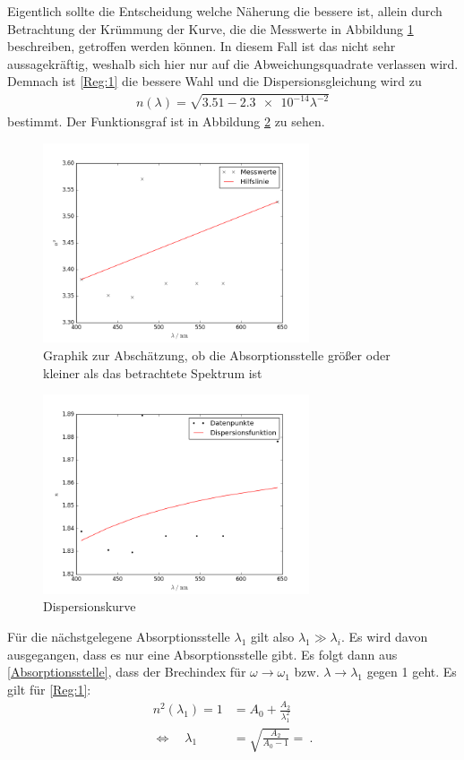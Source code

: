 Eigentlich sollte die Entscheidung welche Näherung die bessere ist, allein durch Betrachtung der Krümmung der Kurve, die die Messwerte in Abbildung \ref{Abb:Krummung} beschreiben, getroffen werden können. In diesem Fall ist das nicht sehr aussagekräftig, weshalb sich hier nur auf die Abweichungsquadrate verlassen wird. Demnach ist \eqref{Reg:1} die bessere Wahl und die Dispersionsgleichung wird zu
\begin{align*}
	n(\lambda) = \sqrt{3.51 - \SI{2.3e-14}\lambda^{-2}}
\end{align*}
bestimmt. Der Funktionsgraf ist in Abbildung \ref*{fig:DispKurve} zu sehen.
\begin{figure}[h!]
	\centering
	\includegraphics[width=0.7\textwidth]{Tendenz.png}
	\caption{Graphik zur Abschätzung, ob die Absorptionsstelle größer oder kleiner als das betrachtete Spektrum ist}
	\label{Abb:Krummung}
\end{figure}
\begin{figure}[h!]
	\centering
	\includegraphics[width=0.7\textwidth]{Dispersionskurve.png}
	\caption{Dispersionskurve}
	\label{fig:DispKurve}
\end{figure}
\newline
Für die nächstgelegene Absorptionsstelle $\lambda_1$ gilt also $\lambda_1\gg\lambda_i$. Es wird davon ausgegangen, dass es nur eine Absorptionsstelle gibt. Es folgt dann aus \eqref{Absorptionsstelle}, dass der Brechindex für $\omega\rightarrow\omega_1$ bzw. $\lambda\rightarrow\lambda_1$ gegen 1 geht. Es gilt für \eqref{Reg:1}:
\begin{align*}
	n^2(\lambda_1) = 1 &= A_0 + \frac{A_2}{\lambda_1^2} \\
	\Leftrightarrow\quad \lambda_1 &= \sqrt{\frac{A_2}{A_0-1}} =  \ .
\end{align*}
\clearpage
